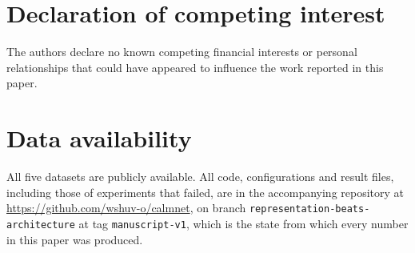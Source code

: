 \documentclass[a4paper,fleqn]{cas-dc}
\begin{document}
\section*{Declaration of competing interest}
The authors declare no known competing financial interests or personal
relationships that could have appeared to influence the work reported in this
paper.

\section*{Data availability}
All five datasets are publicly available. All code, configurations and result
files, including those of experiments that failed, are in the accompanying
repository at \url{https://github.com/wshuv-o/calmnet}, on branch
\texttt{representation-beats-architecture} at tag \texttt{manuscript-v1}, which
is the state from which every number in this paper was produced.



\end{document}
